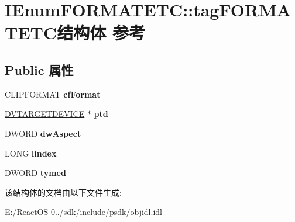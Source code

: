 \hypertarget{struct_i_enum_f_o_r_m_a_t_e_t_c_1_1tag_f_o_r_m_a_t_e_t_c}{}\section{I\+Enum\+F\+O\+R\+M\+A\+T\+E\+TC\+:\+:tag\+F\+O\+R\+M\+A\+T\+E\+T\+C结构体 参考}
\label{struct_i_enum_f_o_r_m_a_t_e_t_c_1_1tag_f_o_r_m_a_t_e_t_c}
\subsection*{Public 属性}
\begin{DoxyCompactItemize}
\item 
\mbox{\label{struct_i_enum_f_o_r_m_a_t_e_t_c_1_1tag_f_o_r_m_a_t_e_t_c_a194e156789b025e2e145b448ba5b2be9}} 
C\+L\+I\+P\+F\+O\+R\+M\+AT {\bfseries cf\+Format}
\item 
\mbox{\label{struct_i_enum_f_o_r_m_a_t_e_t_c_1_1tag_f_o_r_m_a_t_e_t_c_ad6ae6d1402c008858e2059b091c16042}} 
\hyperlink{struct_i_enum_f_o_r_m_a_t_e_t_c_1_1tag_d_v_t_a_r_g_e_t_d_e_v_i_c_e}{D\+V\+T\+A\+R\+G\+E\+T\+D\+E\+V\+I\+CE} $\ast$ {\bfseries ptd}
\item 
\mbox{\label{struct_i_enum_f_o_r_m_a_t_e_t_c_1_1tag_f_o_r_m_a_t_e_t_c_a65e943e53c0e1af6e32a4ca04ea59eb7}} 
D\+W\+O\+RD {\bfseries dw\+Aspect}
\item 
\mbox{\label{struct_i_enum_f_o_r_m_a_t_e_t_c_1_1tag_f_o_r_m_a_t_e_t_c_a9f8970fa378ce26d8e78f90b623eb00d}} 
L\+O\+NG {\bfseries lindex}
\item 
\mbox{\label{struct_i_enum_f_o_r_m_a_t_e_t_c_1_1tag_f_o_r_m_a_t_e_t_c_a5dac9955059cff085ecd9d6cf1fdb88c}} 
D\+W\+O\+RD {\bfseries tymed}
\end{DoxyCompactItemize}


该结构体的文档由以下文件生成\+:\begin{DoxyCompactItemize}
\item 
E\+:/\+React\+O\+S-\/0../sdk/include/psdk/objidl.\+idl\end{DoxyCompactItemize}
